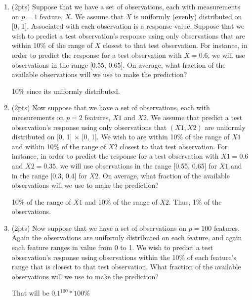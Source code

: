 \documentclass[a4paper]{article}
\theoremstyle{definition}
\newenvironment{soln}{
    \leavevmode\color{blue}\ignorespaces
}{}
\begin{document}
\begin{enumerate}
\begin{enumerate}
	\item (2pts) Suppose that we have a set of observations, each with measurements on $p=1$ feature, $X$. We assume that $X$ is uniformly (evenly) distributed on [0, 1]. Associated with each observation is a response value. Suppose that we wish to predict a test observation’s response using only observations that are within 10\% of the range of $X$ closest to that test observation. For instance, in order to predict the response for a test observation with $X=0.6$, we will use observations in the range [0.55, 0.65]. On average, what fraction of the available observations will we use to make the prediction?
	
	\begin{soln} 
		10\% since its uniformly distributed.
	\end{soln}
	
	
	\item (2pts) Now suppose that we have a set of observations, each with measurements on $p =2$ features, $X1$ and $X2$. We assume that predict a test observation’s response using only observations that $(X1,X2)$ are uniformly distributed on [0, 1] × [0, 1]. We wish to are within 10\% of the range of $X1$ and within 10\% of the range of $X2$ closest to that test observation. For instance, in order to predict the response for a test observation with $X1 =0.6$ and $X2 =0.35$, we will use observations in the range [0.55, 0.65] for $X1$ and in the range [0.3, 0.4] for $X2$. On average, what fraction of the available observations will we use to make the prediction?
	
	\begin{soln}
		10\% of the range of $X1$ and 10\% of the range of $X2$. Thus, 1\% of the observations.
	\end{soln}
	
	\item (2pts) Now suppose that we have a set of observations on $p = 100$ features. Again the observations are uniformly distributed on each feature, and again each feature ranges in value from 0 to 1. We wish to predict a test observation’s response using observations within the 10\% of each feature’s range that is closest to that test observation. What fraction of the available observations will we use to make the prediction?
	
	\begin{soln}
		That will be $0.1^{100} * 100 \%$
	\end{soln}
	

\end{enumerate}
\end{enumerate}
\end{document}
